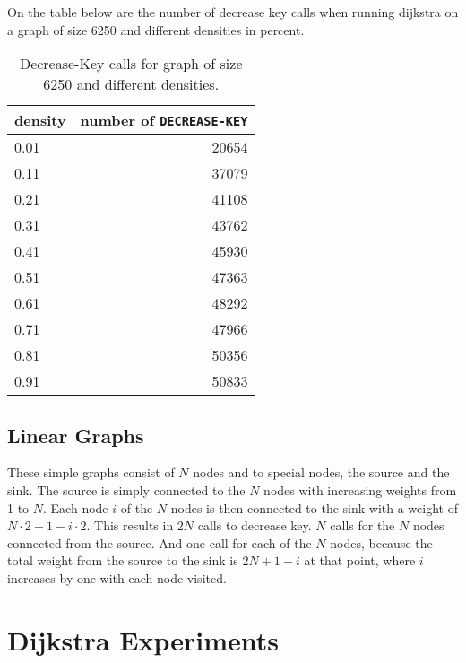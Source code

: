 \documentclass[a4paper,10pt]{article}
\begin{document}
On the table below are the number of decrease key calls when running dijkstra on a graph of size 6250 and different densities in percent.

\begin{table}
  \begin{center}
    \begin{tabular}{l|r}
      density & number of \texttt{DECREASE\--KEY} \\
      \hline
      0.01 & 20654\\
      0.11 & 37079\\
      0.21 & 41108\\
      0.31 & 43762\\
      0.41 & 45930\\
      0.51 & 47363\\
      0.61 & 48292\\
      0.71 & 47966\\
      0.81 & 50356\\
      0.91 & 50833
    \end{tabular}
    \caption{Decrease-Key calls for graph of size 6250 and different densities.}
  \end{center}
\end{table}

\subsection{Linear Graphs}
These simple graphs consist of $N$ nodes and to special nodes, the source and the sink. The source is simply connected to the $N$ nodes with increasing weights from 1 to $N$. Each node $i$ of the $N$ nodes is then connected to the sink with a weight of $N\cdot 2 +1 - i\cdot 2$. This results in $2N$ calls to decrease key. $N$ calls for the $N$ nodes connected from the source. And one call for each of the $N$ nodes, because the total weight from the source to the sink is $2N +1 -i$ at that point, where $i$ increases by one with each node visited.

\section{Dijkstra Experiments}
\end{document}
